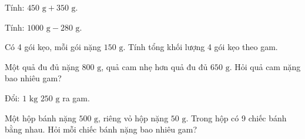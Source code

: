 \begin{ex} %
Tính: $450\text{ g} + 350\text{ g}$.
\end{ex}

\begin{ex} %
Tính: $1000\text{ g} - 280\text{ g}$.
\end{ex}

\begin{ex} %
Có 4 gói kẹo, mỗi gói nặng $150\text{ g}$. Tính tổng khối lượng 4 gói kẹo theo gam.
\end{ex}

\begin{ex} %
Một quả đu đủ nặng $800\text{ g}$, quả cam nhẹ hơn quả đu đủ $650\text{ g}$. Hỏi quả cam nặng bao nhiêu gam?
\end{ex}

\begin{ex} %
Đổi: $1\text{ kg } 250\text{ g}$ ra gam.
\end{ex}

\begin{ex} %
Một hộp bánh nặng $500\text{ g}$, riêng vỏ hộp nặng $50\text{ g}$. Trong hộp có 9 chiếc bánh bằng nhau. Hỏi mỗi chiếc bánh nặng bao nhiêu gam?
\end{ex}
